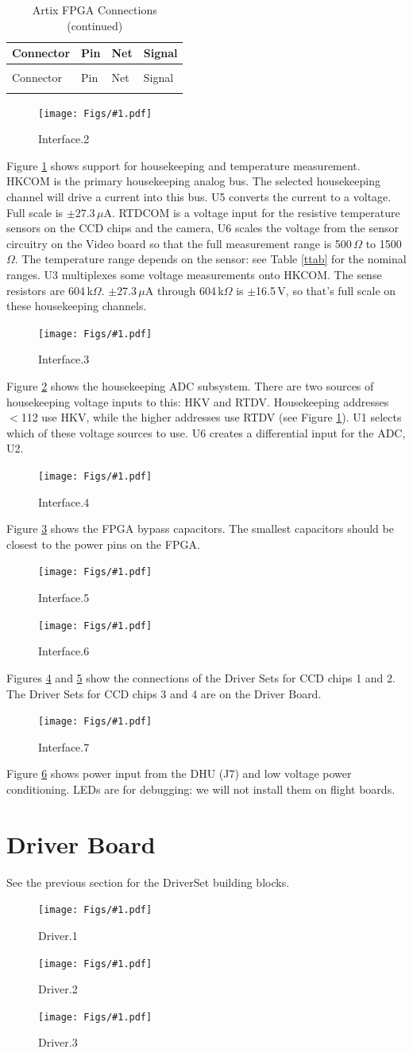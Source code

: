\documentclass[12pt]{article}
\let\oldsection\section
\renewcommand{\section}{\FloatBarrier\oldsection}
\newcommand{\schempage}[1]{
   \begin{center}
\begin{figure}[ht!]
   \centerline{\texttt{[image: Figs/\#1.pdf]}}
    \caption{#1}
    \label{#1}
    \end{figure}
\end{center}
}
\begin{document}
\begin{longtable}{|Hl|l|l|} %
\caption{Artix FPGA Connections} \label{Artix} \\
\hline
Connector & Pin & Net & Signal \\
\hline \endfirsthead
\caption{Artix FPGA Connections (continued)} \\
\hline 
Connector & Pin & Net & Signal \\
\hline
\endhead
\hline \endfoot

\end{longtable}

\FloatBarrier
\schempage{Interface.2}
Figure \ref{Interface.2} shows support for housekeeping and temperature measurement. HKCOM is the primary housekeeping analog bus. The selected housekeeping channel will drive a current into this bus. U5 converts the current to a voltage. Full scale is $\pm27.3\,\mu$A. RTDCOM is a voltage input for the resistive temperature sensors on the CCD chips and the camera, U6 scales the voltage from the sensor circuitry on the Video board so that the full measurement range is 500\,$\Omega$ to 1500\,$\Omega$. The temperature range depends on the sensor: see Table \ref{ttab} for the nominal ranges. U3 multiplexes some voltage measurements onto HKCOM. The sense resistors are 604\,k$\Omega$. $\pm27.3\,\mu$A through 604\,k$\Omega$ is $\pm$16.5\,V, so that's full scale on these housekeeping channels.

\schempage{Interface.3}
Figure \ref{Interface.3} shows the housekeeping ADC subsystem. There are two sources of housekeeping voltage inputs to this: HKV and RTDV. Housekeeping addresses $<$112 use HKV, while the higher addresses use RTDV (see Figure \ref{Interface.2}). U1 selects which of these voltage sources to use. U6 creates a differential input for the ADC, U2.

\schempage{Interface.4}
Figure \ref{Interface.4} shows the FPGA bypass capacitors. The smallest capacitors should be closest to the power pins on the FPGA.

\schempage{Interface.5}
\schempage{Interface.6}
Figures \ref{Interface.5} and \ref{Interface.6} show the connections of the Driver Sets for CCD chips 1 and 2. The Driver Sets for CCD chips 3 and 4 are on the Driver Board.
\FloatBarrier
\schempage{Interface.7}
\FloatBarrier
Figure \ref{Interface.7} shows power input from the DHU (J7) and low voltage power conditioning. LEDs are for debugging: we will not install them on flight boards.

\section{Driver Board}
\label{Driver}
See the previous section for the DriverSet building blocks.
\schempage{Driver.1}
\schempage{Driver.2}
\schempage{Driver.3}
\end{document}
